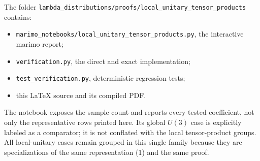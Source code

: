 \documentclass[11pt]{article}
\begin{document}
The folder \texttt{lambda\_distributions/proofs/local\_unitary\_tensor\_products} contains:
\begin{itemize}[leftmargin=1.5em]
 \item \texttt{marimo_notebooks/local_unitary_tensor_products.py}, the interactive marimo report;
 \item \texttt{verification.py}, the direct and exact implementation;
 \item \texttt{test\_verification.py}, deterministic regression tests;
 \item this \LaTeX{} source and its compiled PDF.
\end{itemize}
The notebook exposes the sample count and reports every tested coefficient, not
only the representative rows printed here. Its global $U(3)$ case is explicitly
labeled as a comparator; it is not conflated with the local tensor-product
groups. All local-unitary cases remain grouped in this single family because
they are specializations of the same representation (1) and the same proof.
\end{document}
